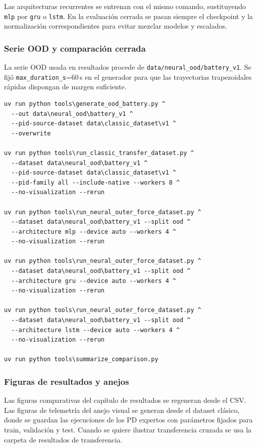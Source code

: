 Las arquitecturas recurrentes se entrenan con el mismo comando, sustituyendo
\texttt{mlp} por \texttt{gru} o \texttt{lstm}. En la evaluación cerrada se pasan
siempre el checkpoint y la normalización correspondientes para evitar mezclar
modelos y escalados.

\subsubsection*{Serie OOD y comparación cerrada}

La serie OOD usada en resultados procede de \texttt{data/neural\_ood/battery\_v1}. Se fijó
\texttt{max\_duration\_s}=60\,s en el generador para que las trayectorias trapezoidales
rápidas dispongan de margen suficiente.

\begin{verbatim}
uv run python tools\generate_ood_battery.py ^
  --out data\neural_ood\battery_v1 ^
  --pid-source-dataset data\classic_dataset\v1 ^
  --overwrite

uv run python tools\run_classic_transfer_dataset.py ^
  --dataset data\neural_ood\battery_v1 ^
  --pid-source-dataset data\classic_dataset\v1 ^
  --pid-family all --include-native --workers 8 ^
  --no-visualization --rerun

uv run python tools\run_neural_outer_force_dataset.py ^
  --dataset data\neural_ood\battery_v1 --split ood ^
  --architecture mlp --device auto --workers 4 ^
  --no-visualization --rerun

uv run python tools\run_neural_outer_force_dataset.py ^
  --dataset data\neural_ood\battery_v1 --split ood ^
  --architecture gru --device auto --workers 4 ^
  --no-visualization --rerun

uv run python tools\run_neural_outer_force_dataset.py ^
  --dataset data\neural_ood\battery_v1 --split ood ^
  --architecture lstm --device auto --workers 4 ^
  --no-visualization --rerun

uv run python tools\summarize_comparison.py
\end{verbatim}

\subsubsection*{Figuras de resultados y anejos}

Las figuras comparativas del capítulo de resultados se regeneran desde el CSV.
Las figuras de telemetría del anejo visual se generan desde el dataset clásico,
donde se guardan las ejecuciones de los PD expertos con parámetros fijados
para train, validación y test. Cuando se quiere ilustrar transferencia cruzada
se usa la carpeta de resultados de transferencia.

